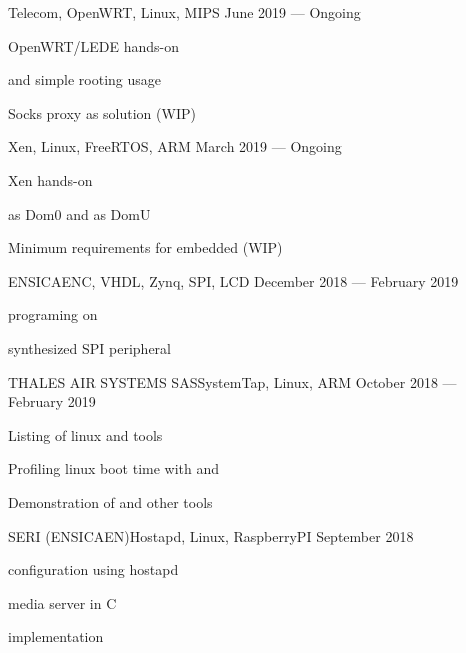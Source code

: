 
    {}{Telecom, OpenWRT, Linux, MIPS}
    {June 2019 --- Ongoing}
    {\begin{additems}
        \item OpenWRT/LEDE  hands-on
        \item {} and simple rooting usage
        \item Socks proxy as  solution (WIP)
    \end{additems}}

    {}{Xen, Linux, FreeRTOS, ARM}
    {March 2019 --- Ongoing}
    {\begin{additems}
        \item Xen  hands-on
        \item {} as Dom0 and  as DomU
        \item Minimum requirements for embedded (WIP)
    \end{additems}}

    {ENSICAEN}{C, VHDL, Zynq, SPI, LCD}
    {December 2018 --- February 2019}
    {\begin{additems}
        \item {} programing on 
        \item {} synthesized SPI peripheral
    \end{additems}}

    {THALES AIR SYSTEMS SAS}{SystemTap, Linux, ARM}
    {October 2018 --- February 2019}
    {\begin{additems}
        \item Listing of linux  and  tools
        \item Profiling linux boot time with  and 
        \item Demonstration of  and other tools
    \end{additems}}

    {SERI (ENSICAEN)}{Hostapd, Linux, RaspberryPI}
    {September 2018}
    {\begin{additems}
        \item {} configuration using hostapd
        \item {} media server in C
        \item {} implementation
    \end{additems}}
